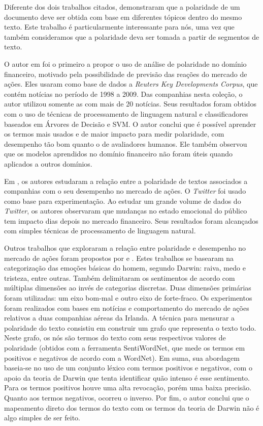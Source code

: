 \documentclass[a4paper,12pt]{article}
\begin{document}
Diferente dos dois trabalhos citados, \cite{SA} demonstraram que a polaridade de um documento deve ser obtida com base em diferentes tópicos dentro do mesmo texto. Este trabalho é particularmente interessante para nós, uma vez que também consideramos que a polaridade deva ser tomada a partir de segmentos de texto.

O autor em \cite{pablotese} foi o primeiro a propor o uso de análise de polaridade no domínio financeiro, motivado pela possibilidade de previsão das reações do mercado de ações. Eles usaram como base de dados a \textit{Reuters Key Developments Corpus}, que contém notícias no período de 1998 a 2009. Das companhias nesta coleção, o autor utilizou somente as com mais de 20 notícias. Seus resultados foram obtidos com o uso de técnicas de processamento de linguagem natural e classificadores baseados em Árvores de Decisão e SVM. O autor conclui que é possível aprender os termos mais usados e de maior impacto para medir polaridade, com desempenho tão bom quanto o de avaliadores humanos. Ele também observou que os modelos aprendidos no domínio financeiro não foram úteis quando aplicados a outros domínios. 

Em \cite{jbhx}, os autores estudaram a relação entre a polaridade de textos associados a companhias com o seu desempenho no mercado de ações. O \textit{Twitter} foi usado como base para experimentação. 
Ao estudar um grande volume de dados do \textit{Twitter}, os autores observaram que mudanças no estado emocional do público tem impacto dias depois no mercado financeiro. Seus resultados foram alcançados com simples técnicas de processamento de linguagem natural.

Outros trabalhos que exploraram a relação entre polaridade e desempenho no mercado de ações foram propostos por \cite{lexiconAA} e \cite{cohesion}. Estes trabalhos se basearam na categorização das emoções básicas do homem, segundo Darwin: raiva, medo e tristeza, entre outras. Também delimitaram os sentimentos de acordo com múltiplas dimensões ao invés de categorias discretas. Duas dimensões primárias foram utilizadas: um eixo bom-mal e outro eixo de forte-fraco. Os experimentos foram realizados com bases em notícias e comportamento do mercado de ações relativos a duas companhias aéreas da Irlanda. A técnica para mensurar a polaridade do texto consistiu em construir um grafo que representa o texto todo. Neste grafo, os nós são termos do texto com seus respectivos valores de polaridade (obtidos com a ferramenta SentiWordNet, que mede os termos em positivos e negativos de acordo com a WordNet). Em suma, sua abordagem baseia-se no uso de um conjunto léxico com termos positivos e negativos, com o apoio da teoria de Darwin que tenta identificar quão intenso é esse sentimento. Para os termos positivos houve uma alta revocação, porém uma baixa precisão. Quanto aos termos negativos, ocorreu o inverso. Por fim, o autor conclui que o mapeamento direto dos termos do texto com os termos da teoria de Darwin não é algo simples de ser feito.
\end{document}
